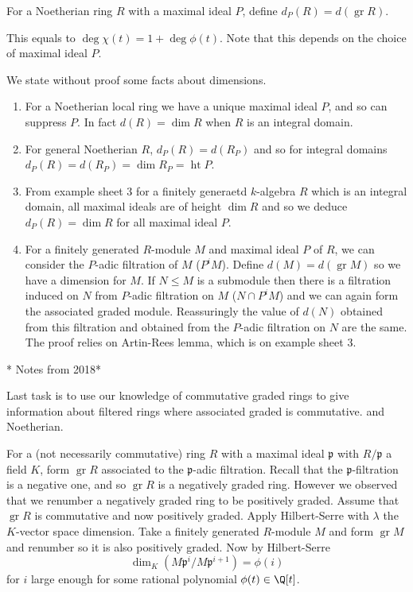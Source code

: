 \documentclass[a4paper]{article}
\DeclareMathOperator{\htt}{ht} %
\DeclareMathOperator{\gr}{gr} %
\begin{document}
\begin{definition}
  For a Noetherian ring \(R\) with a maximal ideal \(P\), define \(d_P(R) = d(\gr R)\).
\end{definition}

This equals to \(\deg \chi(t) = 1 + \deg \phi(t)\). Note that this depends on the choice of maximal ideal \(P\).

\begin{remark}
  We state without proof some facts about dimensions.
  \begin{enumerate}
  \item For a Noetherian local ring we have a unique maximal ideal \(P\), and so can suppress \(P\). In fact \(d(R) = \dim R\) when \(R\) is an integral domain.
  \item For general Noetherian \(R\), \(d_P(R) = d(R_P)\) and so for integral domains \(d_P(R) = d(R_P) = \dim R_P = \htt P\).
  \item From example sheet 3 for a finitely generaetd \(k\)-algebra \(R\) which is an integral domain, all maximal ideals are of height \(\dim R\) and so we deduce \(d_P(R) = \dim R\) for all maximal ideal \(P\).
  \item For a finitely generated \(R\)-module \(M\) and maximal ideal \(P\) of \(R\), we can consider the \(P\)-adic filtration of \(M\) (\(P^iM\)). Define \(d(M) = d(\gr M)\) so we have a dimension for \(M\). If \(N \leq M\) is a submodule then there is a filtration induced on \(N\) from \(P\)-adic filtration on \(M\) (\(N \cap P^iM\)) and we can again form the associated graded module. Reassuringly the value of \(d(N)\) obtained from this filtration and obtained from the \(P\)-adic filtration on \(N\) are the same. The proof relies on Artin-Rees lemma, which is on example sheet 3.
  \end{enumerate}
\end{remark}



* Notes from 2018*

Last task is to use our knowledge of commutative graded rings to give information about filtered rings where associated graded is commutative. and Noetherian.

For a (not necessarily commutative) ring \(R\) with a maximal ideal \(\mathfrak p\) with \(R/\mathfrak p\) a field \(K\), form \(\gr R\) associated to the \(\mathfrak p\)-adic filtration. Recall that the \(\mathfrak p\)-filtration is a negative one, and so \(\gr R\) is a negatively graded ring. However we observed that we renumber a negatively graded ring to be positively graded. Assume that \(\gr R\) is commutative and now positively graded. Apply Hilbert-Serre with \(\lambda\) the \(K\)-vector space dimension. Take a finitely generated \(R\)-module \(M\) and form \(\gr M\) and renumber so it is also positively graded. Now by Hilbert-Serre
\[
  \dim_K(M \mathfrak p^i/M \mathfrak p^{i + 1}) = \phi(i)
\]
for \(i\) large enough for some rational polynomial \(\phi(t) \in \Q[t]\).
\end{document}

